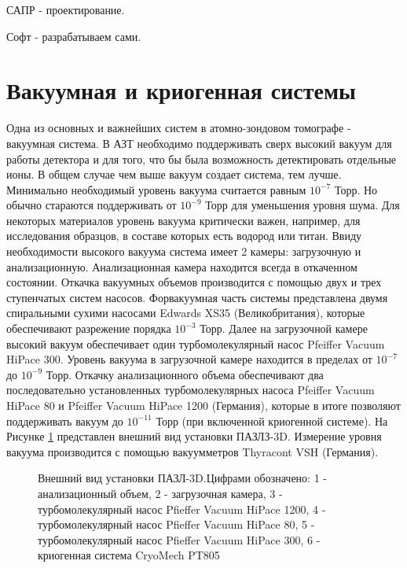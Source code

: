 САПР - проектирование.

Софт - разрабатываем сами.


\FloatBarrier

\section{Вакуумная и криогенная системы}\label{sec:ch2/sec2}

Одна из основных и важнейших систем в атомно-зондовом томографе - вакуумная система. В АЗТ необходимо поддерживать сверх высокий вакуум для работы детектора и для того, что бы была возможность детектировать отдельные ионы. В общем случае чем выше вакуум создает система, тем лучше. Минимально необходимый уровень вакуума считается равным $10^{-7}$ Торр. Но обычно стараются поддерживать от $10^{-9}$ Торр для уменьшения уровня шума. Для некоторых материалов уровень вакуума критически важен, например, для исследования образцов, в составе которых есть водород или титан.
Ввиду необходимости высокого вакуума система имеет 2 камеры: загрузочную и анализационную. Анализационная камера находится всегда в откаченном состоянии. Откачка вакуумных объемов производится с помощью двух и трех ступенчатых систем насосов. Форвакуумная часть системы представлена двумя спиральными сухими насосами Edwards XS35 (Великобритания), которые обеспечивают разрежение порядка $10^{-3}$ Торр. Далее на загрузочной камере высокий вакуум обеспечивает один турбомолекулярный насос Pfeiffer Vacuum HiPace 300. Уровень вакуума в загрузочной камере находится в пределах от $10^{-7}$ до $10^{-9}$ Торр. Откачку анализационного объема обеспечивают два последовательно установленных турбомолекулярных насоса Pfeiffer Vacuum HiPace 80 и Pfeiffer Vacuum HiPace 1200 (Германия), которые в итоге позволяют поддерживать вакуум до $10^{-11}$ Торр (при включенной криогенной системе). На Рисунке \cref{fig:APPLE_foto_main} представлен внешний вид установки ПАЗЛЗ-3D. Измерение уровня вакуума производится с помощью вакуумметров Thyracont VSH (Германия).

\begin{figure}[htb]
	\caption{Внешний вид установки ПАЗЛ-3D.Цифрами обозначено: 1 - анализационный объем, 2 - загрузочная камера, 3 - турбомолекулярный насос Pfieffer Vacuum HiPace 1200, 4 - турбомолекулярный насос Pfieffer Vacuum HiPace 80, 5 - турбомолекулярный насос Pfieffer Vacuum HiPace 300, 6 - криогенная система CryoMech PT805}
	\label{fig:APPLE_foto_main}
\end{figure}


